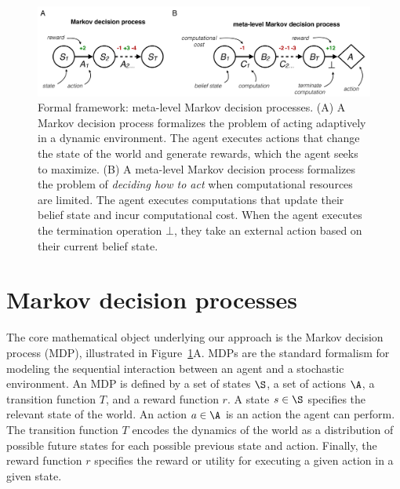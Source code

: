 
\begin{figure}
  \includegraphics[width=\textwidth]{figs/metamdp.pdf}
  \caption{Formal framework: meta-level Markov decision processes.
  (A) A Markov decision process formalizes the problem of acting adaptively in a dynamic environment. The agent executes actions that change the state of the world and generate rewards, which the agent seeks to maximize.
  (B) A meta-level Markov decision process formalizes the problem of \emph{deciding how to act} when computational resources are limited. The agent executes computations that update their belief state and incur computational cost. When the agent executes the termination operation $\bot$, they take an external action based on their current belief state.}
  \label{fig:metamdp-diagram}
\end{figure}


\section{Markov decision processes}

The core mathematical object underlying our approach is the Markov decision process (MDP), illustrated in Figure~\ref{fig:metamdp-diagram}A. MDPs are the standard formalism for modeling the sequential interaction between an agent and a stochastic environment. An MDP is defined by a set of states $\S$, a set of actions $\A$, a transition function $T$, and a reward function $r$. A state $s \in \S$ specifies the relevant state of the world. An action $a \in \A$ is an action the agent can perform. The transition function $T$ encodes the dynamics of the world as a distribution of possible future states for each possible previous state and action. Finally, the reward function $r$ specifies the reward or utility for executing a given action in a given state.

